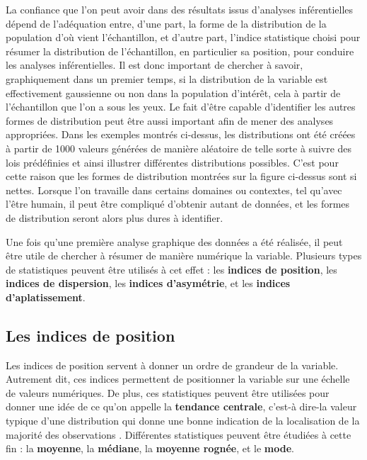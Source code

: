 \documentclass[
]{book}
\begin{document}
La confiance que l'on peut avoir dans des résultats issus d'analyses inférentielles dépend de l'adéquation entre, d'une part, la forme de la distribution de la population d'où vient l'échantillon, et d'autre part, l'indice statistique choisi pour résumer la distribution de l'échantillon, en particulier sa position, pour conduire les analyses inférentielles. Il est donc important de chercher à savoir, graphiquement dans un premier temps, si la distribution de la variable est effectivement gaussienne ou non dans la population d'intérêt, cela à partir de l'échantillon que l'on a sous les yeux. Le fait d'être capable d'identifier les autres formes de distribution peut être aussi important afin de mener des analyses appropriées. Dans les exemples montrés ci-dessus, les distributions ont été créées à partir de 1000 valeurs générées de manière aléatoire de telle sorte à suivre des lois prédéfinies et ainsi illustrer différentes distributions possibles. C'est pour cette raison que les formes de distribution montrées sur la figure ci-dessus sont si nettes. Lorsque l'on travaille dans certains domaines ou contextes, tel qu'avec l'être humain, il peut être compliqué d'obtenir autant de données, et les formes de distribution seront alors plus dures à identifier.

Une fois qu'une première analyse graphique des données a été réalisée, il peut être utile de chercher à résumer de manière numérique la variable. Plusieurs types de statistiques peuvent être utilisés à cet effet : les \textbf{indices de position}, les \textbf{indices de dispersion}, les \textbf{indices d'asymétrie}, et les \textbf{indices d'aplatissement}.

\hypertarget{les-indices-de-position}{%
\subsection{Les indices de position}\label{les-indices-de-position}}

Les indices de position servent à donner un ordre de grandeur de la variable. Autrement dit, ces indices permettent de positionner la variable sur une échelle de valeurs numériques. De plus, ces statistiques peuvent être utilisées pour donner une idée de ce qu'on appelle la \textbf{tendance centrale}, c'est-à dire-la valeur typique d'une distribution qui donne une bonne indication de la localisation de la majorité des observations \autocite{rousseletReactionTimesOther2020}. Différentes statistiques peuvent être étudiées à cette fin : la \textbf{moyenne}, la \textbf{médiane}, la \textbf{moyenne rognée}, et le \textbf{mode}.
\end{document}
